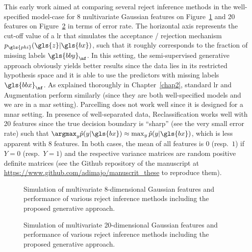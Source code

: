 This early work aimed at comparing several reject inference methods in the well-specified model-case for 8 multivariate Gaussian features on Figure~\ref{fig:simu_4var} and 20 features on Figure~\ref{fig:simu_30var} in terms of error rate. The horizontal axis represents the cut-off value of a \gls{lr} that simulates the acceptance / rejection mechanism $p_{\gls{phi}}(\gls{z} | \gls{bx})$, such that it roughly corresponds to the fraction of missing labels $\gls{bby}_{\nf}$. In this setting, the semi-supervised generative approach obviously yields better results since the data lies in its restricted hypothesis space and it is able to use the predictors with missing labels $\gls{bbx}_{\nf}$. As explained thoroughly in Chapter~\ref{chap2}, standard \gls{lr} and Augmentation perform similarly (since they are both well-specified models and we are in a \gls{mar} setting). Parcelling does not work well since it is designed for a \gls{mnar} setting. In presence of well-separated data, Reclassification works well with 20 features since the true decision boundary is ``sharp'' (see the very small error rate) such that $\argmax_y \hat{p}(y | \gls{bx}) \approx \max_y \hat{p}(y | \gls{bx})$, which is less apparent with 8 features. In both cases, the mean of all features is $0$ (resp.\ $1$) if $Y=0$ (resp.\ $Y=1$) and the respective variance matrices are random positive definite matrices (see the Github repository of the manuscript at \url{https://www.github.com/adimajo/manuscrit_these} to reproduce them).

\begin{figure}[!ht]
\centering \resizebox{.8\textwidth}{!}{}
\caption{Simulation of multivariate 8-dimensional Gaussian features and performance of various reject inference methods including the proposed generative approach.}
\label{fig:simu_4var}
\end{figure}

\begin{figure}[!ht]
\centering \resizebox{.8\textwidth}{!}{}
\caption{Simulation of multivariate 20-dimensional Gaussian features and performance of various reject inference methods including the proposed generative approach.}
\label{fig:simu_30var}
\end{figure}




